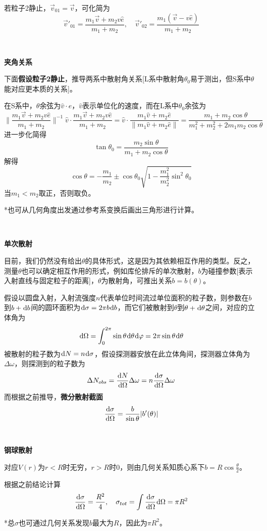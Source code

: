 \documentclass[a4paper,UTF8,fontset=windows]{ctexart}
\newcommand*{\dr}{\hspace{0.07em}\mathrm{d}}
\begin{document}
若粒子2静止，$\vec{v}_{01}=\vec{v}$，可化简为
$$\vec{v}'_{01}=\frac{m_1\vec{v}+m_2v\hat{e}}{m_1+m_2},\quad\vec{v}'_{02}=\frac{m_1(\vec{v}-v\hat{e})}{m_1+m_2}$$

\

\textbf{夹角关系}

下面\textbf{假设粒子2静止}，推导两系中散射角关系[L系中散射角$\theta_0$易于测出，但S系中$\theta$能对应更本质的关系]。

在S系中，$\theta$余弦为$\hat{v}\cdot\hat{e}$，$\hat{v}$表示单位化的速度，而在L系中$\theta_0$余弦为
$$\bigg\|\frac{m_1\vec{v}+m_2v\hat{e}}{m_1+m_2}\bigg\|^{-1}\hat{v}\cdot\frac{m_1\vec{v}+m_2v\hat{e}}{m_1+m_2}=\hat{v}\cdot\frac{m_1\hat{v}+m_2\hat{e}}{\|m_1\hat{v}+m_2\hat{e}\|}=\frac{m_1+m_2\cos\theta}{m_1^2+m_2^2+2m_1m_2\cos\theta}$$
进一步化简得
$$\tan\theta_0=\frac{m_2\sin\theta}{m_1+m_2\cos\theta}$$
解得
$$\cos\theta=-\frac{m_1}{m_2}\pm\cos\theta_0\sqrt{1-\frac{m_1^2}{m_2^2}\sin^2\theta_0}$$
当$m_1<m_2$取正，否则取负。

*也可从几何角度出发通过参考系变换后画出三角形进行计算。

\

\textbf{单次散射}

目前，我们仍然没有给出$\theta$的具体形式，这是因为其依赖相互作用的类型。反之，测量$\theta$也可以确定相互作用的形式，例如库伦排斥的单次散射，$b$为碰撞参数[表示入射直线与固定粒子的距离]，$\theta$为散射角，可推出关系$b=b(\theta)$。

假设以圆盘入射，入射流强度$n$代表单位时间流过单位面积的粒子数，则参数在$b$到$b+\dr b$间的圆环面积为$\dr\sigma=2\pi b\dr b$，而它们被散射到$\theta$到$\theta+\dr\theta$之间，对应的立体角为
$$\dr\Omega=\int_0^{2\pi}\sin\theta\dr\theta\dr\varphi=2\pi\sin\theta\dr\theta$$
被散射的粒子数为$\dr N=n\dr\sigma$，假设探测器安放在此立体角间，探测器立体角为$\Delta\omega$，则探测到的粒子数为
$$\Delta N_{obs}=\frac{\dr N}{\dr\Omega}\Delta\omega=n\frac{\dr\sigma}{\dr\Omega}\Delta\omega$$
而根据之前推导，\textbf{微分散射截面}
$$\frac{\dr\sigma}{\dr\Omega}=\frac{b}{\sin\theta}|b'(\theta)|$$

\

\textbf{钢球散射}

对应$V(r)$为$r<R$时无穷，$r>R$时0，则由几何关系知质心系下$b=R\cos\frac{\theta}{2}$。

根据之前结论计算
$$\frac{\dr\sigma}{\dr\Omega}=\frac{R^2}{4},\quad\sigma_{tot}=\int\frac{\dr\sigma}{\dr\Omega}\dr\Omega=\pi R^2$$

*总$\sigma$也可通过几何关系发现$b$最大为$R$，因此为$\pi R^2$。
\end{document}
